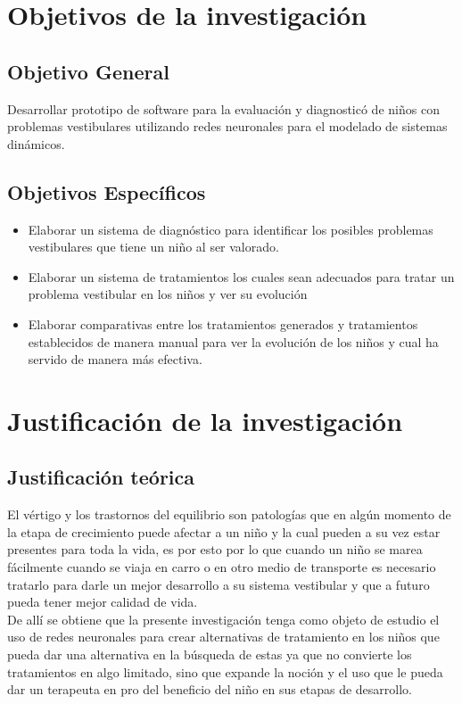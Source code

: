\section{Objetivos de la investigación}
	\subsection{Objetivo General}
	Desarrollar prototipo de software para la evaluación y diagnosticó de niños con problemas vestibulares utilizando redes neuronales para el modelado de sistemas dinámicos.
	\subsection{Objetivos Específicos}
	\begin{itemize}
		\item Elaborar un sistema de diagnóstico para identificar los posibles problemas vestibulares que tiene un niño al ser valorado.
		\item Elaborar un sistema de tratamientos los cuales sean adecuados para tratar un problema vestibular en los niños y ver su evolución
		\item Elaborar comparativas entre los tratamientos generados y tratamientos establecidos de manera manual para ver la evolución de los niños y cual ha servido de manera más efectiva.
	\end{itemize}
\newpage
\section{Justificación de la investigación}
	\subsection{Justificación teórica}
		El vértigo y los trastornos del equilibrio son patologías que en algún momento de la etapa de crecimiento puede afectar a un niño y la cual pueden a su vez estar presentes para toda la vida, es por esto por lo que cuando un niño se marea fácilmente cuando se viaja en carro o en otro medio de transporte es necesario tratarlo para darle un mejor desarrollo a su sistema vestibular y que a futuro pueda tener mejor calidad de vida.\\
		De allí se obtiene que la presente investigación tenga como objeto de estudio el uso de redes neuronales para crear alternativas de tratamiento en los niños que pueda dar una alternativa en la búsqueda de estas ya que no convierte los tratamientos en algo limitado, sino que expande la noción y el uso que le pueda dar un terapeuta en pro del beneficio del niño en sus etapas de desarrollo.\\
